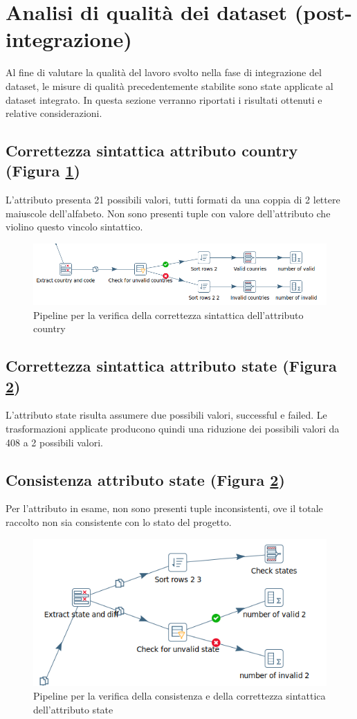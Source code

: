 \newpage
\section{Analisi di qualità dei dataset (post-integrazione)}
Al fine di valutare la qualità del lavoro svolto nella fase di integrazione del dataset, le misure di qualità precedentemente stabilite sono state applicate al dataset integrato. In questa sezione verranno riportati i risultati ottenuti e relative considerazioni.

\subsection{Correttezza sintattica attributo country (Figura \ref{fig:dqtcountries})}
L'attributo presenta 21 possibili valori, tutti formati da una coppia di 2 lettere maiuscole dell'alfabeto. Non sono presenti tuple con valore dell'attributo che violino questo vincolo sintattico.

\begin{figure}[h!]
	\centering
	\includegraphics[width=1\linewidth]{images/DQT_countries}
	\caption{Pipeline per la verifica della correttezza sintattica dell'attributo country}
	\label{fig:dqtcountries}
\end{figure}


\subsection{Correttezza sintattica attributo state (Figura \ref{fig:dqtstate})}
L'attributo state risulta assumere due possibili valori, successful e failed. Le trasformazioni applicate producono quindi una riduzione dei possibili valori da 408 a 2 possibili valori.

\subsection{Consistenza attributo state (Figura \ref{fig:dqtstate})}
Per l'attributo in esame, non sono presenti tuple inconsistenti, ove il totale raccolto non sia consistente con lo stato del progetto.

\begin{figure}[h!]
	\centering
	\includegraphics[width=0.6\linewidth]{images/DQT_state}
	\caption{Pipeline per la verifica della consistenza e della correttezza sintattica dell'attributo state}
	\label{fig:dqtstate}
\end{figure}

